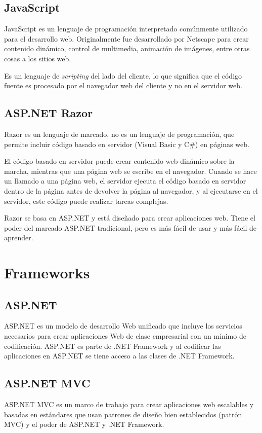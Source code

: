 \subsection{JavaScript}
JavaScript es un lenguaje de programación  interpretado comúnmente utilizado para el desarrollo web. Originalmente fue desarrollado por Netscape para crear contenido dinámico, control de multimedia, animación de imágenes, entre otras cosas a los sitios web.

Es un lenguaje de \textit{scripting} del lado del cliente, lo que significa que el código fuente es procesado por el navegador web del cliente y no en el servidor web. \cite{javaScriptChristensson}

\subsection{ASP.NET Razor}
Razor es un lenguaje de marcado, no es un lenguaje de programación, que permite incluir código basado en servidor (Visual Basic y C\#) en páginas web. 

El código basado en servidor puede crear contenido web dinámico sobre la marcha, mientras que una página web se escribe en el navegador. Cuando se hace un llamado a una página web, el servidor ejecuta el código basado en servidor dentro de la página antes de devolver la página al navegador, y al ejecutarse en el servidor, este código puede realizar tareas complejas.
 
Razor se basa en ASP.NET y está diseñado para crear aplicaciones web. Tiene el poder del marcado ASP.NET tradicional, pero es más fácil de usar y más fácil de aprender. \cite{aspRazorW3school}


\section{Frameworks}
\subsection{ASP.NET}
ASP.NET es un modelo de desarrollo Web unificado que incluye los servicios necesarios para crear aplicaciones Web de clase empresarial con un mínimo de codificación. ASP.NET es parte de .NET Framework y al codificar las aplicaciones en ASP.NET se tiene acceso a las clases de .NET Framework. \cite{aspMicrosoft}

\subsection{ASP.NET MVC}
ASP.NET MVC es un marco de trabajo para crear aplicaciones web escalables y basadas en estándares que usan patrones de diseño bien establecidos (patrón MVC) y el poder de ASP.NET y .NET Framework. \cite{aspmvcMicrosoft}

